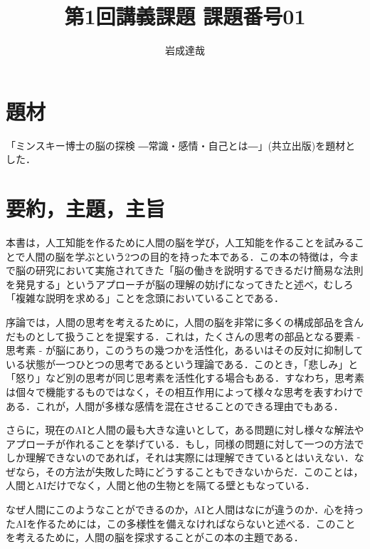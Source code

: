 \documentclass{jarticle}
\title{第1回講義課題 課題番号01}
\date{\todayd}
\author{岩成達哉}
\begin{document}
\begin{titlepage}
	\setlength{\topmargin}{1.1in}
	\vspace{100mm}
	\maketitle
\end{titlepage}


\section{題材}
「ミンスキー博士の脳の探検 ―常識・感情・自己とは―」(共立出版)を題材とした．


\section{要約，主題，主旨}
本書は，人工知能を作るために人間の脳を学び，人工知能を作ることを試みることで人間の脳を学ぶという2つの目的を持った本である．この本の特徴は，今まで脳の研究において実施されてきた「脳の働きを説明するできるだけ簡易な法則を発見する」というアプローチが脳の理解の妨げになってきたと述べ，むしろ「複雑な説明を求める」ことを念頭においていることである．





序論では，人間の思考を考えるために，人間の脳を非常に多くの構成部品を含んだものとして扱うことを提案する．これは，たくさんの思考の部品となる要素 - 思考素 - が脳にあり，このうちの幾つかを活性化，あるいはその反対に抑制している状態が一つひとつの思考であるという理論である．このとき，「悲しみ」と「怒り」など別の思考が同じ思考素を活性化する場合もある．すなわち，思考素は個々で機能するものではなく，その相互作用によって様々な思考を表すわけである．これが，人間が多様な感情を混在させることのできる理由でもある．

さらに，現在のAIと人間の最も大きな違いとして，ある問題に対し様々な解法やアプローチが作れることを挙げている．もし，同様の問題に対して一つの方法でしか理解できないのであれば，それは実際には理解できているとはいえない．なぜなら，その方法が失敗した時にどうすることもできないからだ．このことは，人間とAIだけでなく，人間と他の生物とを隔てる壁ともなっている．

なぜ人間にこのようなことができるのか，AIと人間はなにが違うのか．心を持ったAIを作るためには，この多様性を備えなければならないと述べる．このことを考えるために，人間の脳を探求することがこの本の主題である．
\end{document}
